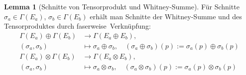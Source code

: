 \documentclass[a4paper]{scrbook}
\numberwithin{equation}{chapter}
\theoremstyle{definition}
\newtheorem{lemma}[defn]{Lemma}
\begin{document}
		\begin{lemma}[Schnitte von Tensorprodukt und Whitney-Summe]
			Für Schnitte $\sigma_a\in\Gamma(E_a)$, $\sigma_b\in\Gamma(E_b)$ erhält man Schnitte der Whitney-Summe und des Tensorproduktes durch \glqq faserweise\grqq\ Verknüpfung:
			\begin{align*}
				\Gamma(E_a)\oplus\Gamma(E_b)&\rightarrow\Gamma(E_a\oplus E_b),\\
				(\sigma_a,\sigma_b)&\mapsto \sigma_a\oplus\sigma_b,\quad (\sigma_a\oplus\sigma_b)(p):=\sigma_a(p)\oplus\sigma_b(p)\\
				\Gamma(E_a)\otimes\Gamma(E_b)&\rightarrow\Gamma(E_a\otimes E_b),\\
				(\sigma_a,\sigma_b)&\mapsto \sigma_a\otimes\sigma_b,\quad (\sigma_a\otimes\sigma_b)(p):=\sigma_a(p)\otimes\sigma_b(p)
			\end{align*}
		\end{lemma}
		
\end{document}
